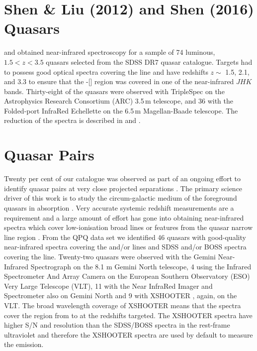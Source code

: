 \section{Shen \& Liu (2012) and Shen (2016) Quasars}

\citet{shen16a} and \citet{shen12} obtained near-infrared spectroscopy for a sample of 74 luminous, $1.5 < z < 3.5$ quasars selected from the SDSS DR7 quasar catalogue. 
Targets had to possess good optical spectra covering the  line and have redshifts $z\sim$ 1.5, 2.1, and 3.3 to ensure that the \hbns-[] region was covered in one of the near-infrared $JHK$ bands.
Thirty-eight of the quasars were observed with TripleSpec \citep{wilson04} on the Astrophysics Research Consortium (ARC) 3.5\,m telescope, and 36 with the Folded-port InfraRed Echellette \citep[FIRE;][]{simcoe10} on the 6.5\,m Magellan-Baade telescope.
The reduction of the spectra is described in \citet{shen16a} and \citet{shen12}. 

\section{Quasar Pairs}

Twenty per cent of our catalogue was observed as part of an ongoing effort to identify quasar pairs at very close projected separations \citep[Quasars Probing Quasars\footnote{www.ucolick.org/\textasciitilde xavier/QPQ/Quasars\_Probing\_Quasars} (QPQ);][]{hennawi06a,hennawi10}. 
The primary science driver of this work is to study the circum-galactic medium of the foreground quasars in absorption \citep{hennawi06b}.
Very accurate systemic redshift measurements are a requirement and a large amount of effort has gone into obtaining near-infrared spectra which cover low-ionisation broad lines or features from the quasar narrow line region \citep{prochaska09,lau15,hennawi15}. 
From the QPQ data set we identified 46 quasars with good-quality near-infrared spectra covering the \ha and/or \hb lines and SDSS and/or BOSS spectra covering the  line. 
Twenty-two quasars were observed with the Gemini Near-Infrared Spectrograph \citep[GNIRS;][]{elias06} on the 8.1 m Gemini North telescope, 4 using the Infrared Spectrometer And Array Camera \citep[ISAAC;][]{moorwood98b} on the European Southern Observatory (ESO) Very Large Telescope (VLT), 11 with the Near InfraRed Imager and Spectrometer \citep[NIRI;][]{hodapp03} also on Gemini North and 9 with XSHOOTER \citep{vernet11}, again, on the VLT. 
The broad wavelength coverage of XSHOOTER means that the spectra cover the region from  to \ha at the redshifts targeted. 
The XSHOOTER spectra have higher S/N and resolution than the SDSS/BOSS spectra in the rest-frame ultraviolet and therefore the XSHOOTER spectra are used by default to measure the  emission. 

